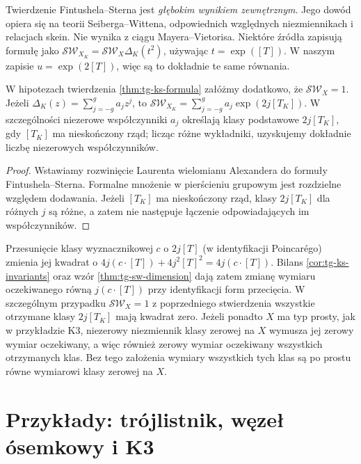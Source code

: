 \begin{uwaga}
Twierdzenie Fintushela--Sterna jest \emph{głębokim
wynikiem zewnętrznym}. Jego dowód opiera się na teorii
Seiberga--Wittena, odpowiednich względnych niezmiennikach
i relacjach skein. Nie wynika z ciągu Mayera--Vietorisa.
Niektóre źródła zapisują formułę jako
$\mathcal{SW}_{X_K}=\mathcal{SW}_X\Delta_K(t^2)$,
używając $t=\exp([T])$. W naszym zapisie
$u=\exp(2[T])$, więc są to dokładnie te same równania.
\end{uwaga}

\begin{stwierdzenie}
\label{prop:tg-ks-basic}
W hipotezach twierdzenia \ref{thm:tg-ks-formula}
załóżmy dodatkowo, że $\mathcal{SW}_X=1$.
Jeżeli $\Delta_K(z)=\sum_{j=-g}^{g}a_jz^j$,
to $\mathcal{SW}_{X_K}=\sum_{j=-g}^{g}a_j\exp(2j[T_K])$.
W szczególności niezerowe współczynniki $a_j$
określają klasy podstawowe $2j[T_K]$, gdy
$[T_K]$ ma nieskończony rząd; licząc różne wykładniki,
uzyskujemy dokładnie liczbę niezerowych współczynników.
\end{stwierdzenie}

\begin{proof}
Wstawiamy rozwinięcie Laurenta wielomianu Alexandera
do formuły Fintushela--Sterna. Formalne mnożenie
w pierścieniu grupowym jest rozdzielne względem dodawania.
Jeżeli $[T_K]$ ma nieskończony rząd, klasy $2j[T_K]$
dla różnych $j$ są różne, a zatem nie następuje
łączenie odpowiadających im współczynników.
\end{proof}

\begin{uwaga}
Przesunięcie klasy wyznacznikowej $c$ o $2j[T]$
(w identyfikacji Poincarégo) zmienia jej kwadrat o
$4j(c\cdot[T])+4j^2[T]^2=4j(c\cdot[T])$.
Bilans \ref{cor:tg-ks-invariants} oraz wzór
\ref{thm:tg-sw-dimension} dają zatem zmianę wymiaru
oczekiwanego równą $j(c\cdot[T])$ przy identyfikacji
form przecięcia. W szczególnym przypadku
$\mathcal{SW}_X=1$ z poprzedniego stwierdzenia
wszystkie otrzymane klasy $2j[T_K]$ mają kwadrat zero.
Jeżeli ponadto $X$ ma typ prosty, jak w przykładzie K3,
niezerowy niezmiennik klasy zerowej na $X$ wymusza
jej zerowy wymiar oczekiwany, a więc również zerowy
wymiar oczekiwany wszystkich otrzymanych klas. Bez tego założenia
wymiary wszystkich tych klas są po prostu równe
wymiarowi klasy zerowej na $X$.
\end{uwaga}

\section{Przykłady: trójlistnik, węzeł ósemkowy i K3}
\label{sec:tg-ks-examples}

